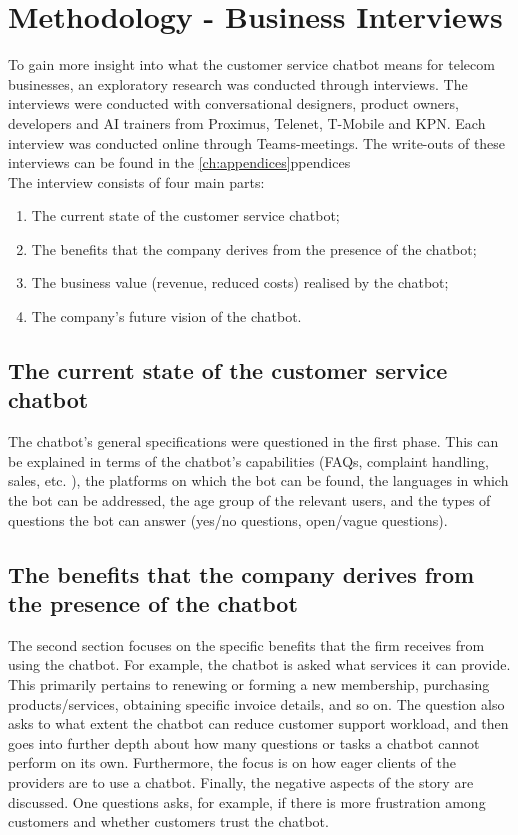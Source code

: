 \section{Methodology - Business Interviews}
To gain more insight into what the customer service chatbot means for telecom businesses, an exploratory research was conducted through interviews. The interviews were conducted with conversational designers, product owners, developers and AI trainers from Proximus, Telenet, T-Mobile and KPN. Each interview was conducted online through Teams-meetings. The write-outs of these interviews can be found in the \ref{ch:appendices}ppendices\\
\break
The interview consists of four main parts:
\begin{enumerate}
	\item The current state of the customer service chatbot;
	\item The benefits that the company derives from the presence of the chatbot;
	\item The business value (revenue, reduced costs) realised by the chatbot;
	\item The company's future vision of the chatbot.
\end{enumerate}

\subsection{The current state of the customer service chatbot}
The chatbot's general specifications were questioned in the first phase. This can be explained in terms of the chatbot's capabilities (FAQs, complaint handling, sales, etc. ), the platforms on which the bot can be found, the languages in which the bot can be addressed, the age group of the relevant users, and the types of questions the bot can answer (yes/no questions, open/vague questions).\\

\subsection{The benefits that the company derives from the presence of the chatbot}
The second section focuses on the specific benefits that the firm receives from using the chatbot. For example, the chatbot is asked what services it can provide. This primarily pertains to renewing or forming a new membership, purchasing products/services, obtaining specific invoice details, and so on. The question also asks to what extent the chatbot can reduce customer support workload, and then goes into further depth about how many questions or tasks a chatbot cannot perform on its own. Furthermore, the focus is on how eager clients of the providers are to use a chatbot. Finally, the negative aspects of the story are discussed. One questions asks, for example, if there is more frustration among customers and whether customers trust the chatbot.\\

